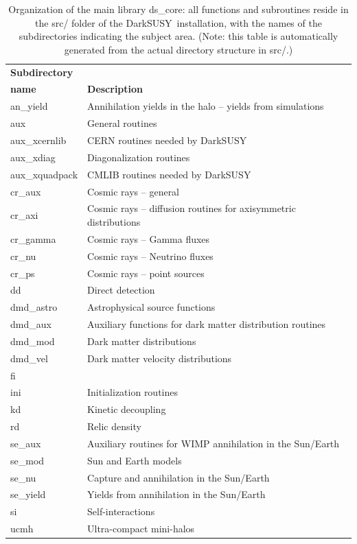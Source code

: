 \documentclass[a4paper,10pt,oneside]{book}
\newcommand{\comment}[1]{}
\newcommand{\code}[1]{\ft{#1}}
\newcommand{\ds}{{\sffamily DarkSUSY}}
\newcommand{\ft}[1]{\textsf{#1}}
\begin{document}
\begin{table}[t!]
\begin{tabular}{lp{10cm}}
{\bfseries Subdirectory} & {\bfseries } \\
{\bfseries name} & {\bfseries Description} \\
\hline
\ft{an\_yield} & Annihilation yields in the halo -- yields from simulations
 \\[0.5ex]
\ft{aux} & General routines
 \\[0.5ex]
\ft{aux\_xcernlib} & CERN routines needed by DarkSUSY
 \\[0.5ex]
\ft{aux\_xdiag} & Diagonalization routines
 \\[0.5ex]
\ft{aux\_xquadpack} & CMLIB routines needed by DarkSUSY
 \\[0.5ex]
\ft{cr\_aux} & Cosmic rays -- general
 \\[0.5ex]
\ft{cr\_axi} & Cosmic rays -- diffusion routines for axisymmetric distributions
 \\[0.5ex]
\ft{cr\_gamma} & Cosmic rays -- Gamma fluxes
 \\[0.5ex]
\ft{cr\_nu} & Cosmic rays -- Neutrino fluxes
 \\[0.5ex]
\ft{cr\_ps} & Cosmic rays -- point sources
 \\[0.5ex]
\ft{dd} & Direct detection
 \\[0.5ex]
\ft{dmd\_astro} & Astrophysical source functions
 \\[0.5ex]
\ft{dmd\_aux} & Auxiliary functions for dark matter distribution routines
 \\[0.5ex]
\ft{dmd\_mod} & Dark matter distributions
 \\[0.5ex]
\ft{dmd\_vel} & Dark matter velocity distributions
 \\[0.5ex]
\ft{fi} & \comment{Missing file: src/fi/DOC-name.tex} \\[0.5ex]
\ft{ini} & Initialization routines
 \\[0.5ex]
\ft{kd} & Kinetic decoupling
 \\[0.5ex]
\ft{rd} & Relic density
 \\[0.5ex]
\ft{se\_aux} & Auxiliary routines for WIMP annihilation in the Sun/Earth
 \\[0.5ex]
\ft{se\_mod} & Sun and Earth models
 \\[0.5ex]
\ft{se\_nu} & Capture and annihilation in the Sun/Earth
 \\[0.5ex]
\ft{se\_yield} & Yields from annihilation in the Sun/Earth
 \\[0.5ex]
\ft{si} & Self-interactions \\[0.5ex]
\ft{ucmh} & Ultra-compact mini-halos
 \\[0.5ex]
\hline
\end{tabular}
\caption{Organization of the main library  \code{ds\_core}: all functions and subroutines 
reside in the \code{src/} folder of the \ds\ installation, with the names of the subdirectories 
indicating the subject area. (Note: this table is automatically generated from the actual directory structure in \code{src/}.)
}
\label{tab:dsmain}
\end{table}
\end{document}
